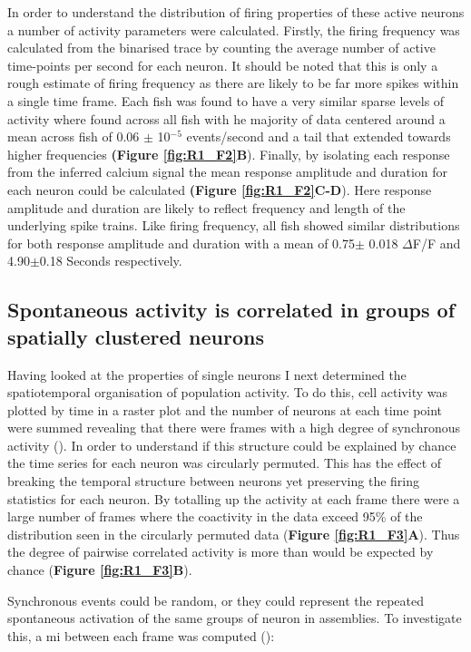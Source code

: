 In order to understand the distribution of firing properties of these active neurons a number of activity parameters were calculated. Firstly, the firing frequency was calculated from the binarised trace by counting the average number of active time-points per second for each neuron. It should be noted that this is only a rough estimate of firing frequency as there are likely to be far more spikes within a single time frame. Each fish was found to have a very similar sparse levels of activity where found across all fish with he majority of data centered around a mean across fish of 0.06 $\pm$ 10$^{-5}$ events/second and a tail that extended towards higher frequencies \textbf{(Figure \ref{fig:R1_F2}B}). Finally, by isolating each response from the inferred calcium signal the mean response amplitude and duration for each neuron could be calculated \textbf{(Figure \ref{fig:R1_F2}C-D}). Here response amplitude and duration are likely to reflect frequency and length of the underlying spike trains. Like firing frequency, all fish showed similar distributions for both response amplitude and duration with a mean of  0.75$\pm$ 0.018 $\Delta$F/F and 4.90$\pm$0.18 Seconds respectively. 


\subsection{Spontaneous activity is correlated in groups of spatially clustered neurons}

Having looked at the properties of single neurons I next  determined the spatiotemporal organisation of population activity. To do this, cell activity was plotted by time in a raster plot and the number of neurons at each time point were summed revealing that there were frames with a high degree of synchronous activity (\cite{Romano2015}). In order to understand if this structure could be explained by chance the time series for each neuron was circularly permuted. This has the effect of breaking the temporal structure between neurons yet preserving the firing statistics for each neuron.	By totalling up the activity at each frame there were a large number of frames where the coactivity in the data exceed	95\% of	the	distribution seen in the circularly permuted data (\textbf{Figure \ref{fig:R1_F3}A}). Thus the degree of pairwise correlated activity is more than would be expected by chance (\textbf{Figure \ref{fig:R1_F3}B}).

Synchronous events could be random, or they could represent the repeated spontaneous activation of the same groups of neuron in assemblies. To investigate this, a \gls{mi} between each frame was computed (\cite{Romano2015}):


